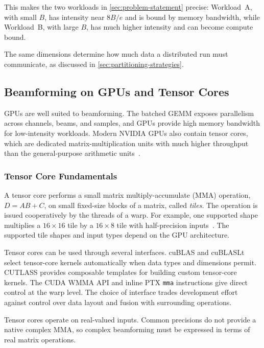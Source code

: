 This makes the two workloads in \cref{sec:problem-statement} precise: Workload~A, with small $B$, has intensity near $8B/e$ and is bound by memory bandwidth, while Workload~B, with large $B$, has much higher intensity and can become compute bound.

The same dimensions determine how much data a distributed run must communicate, as discussed in \cref{sec:partitioning-strategies}.

\subsection{Beamforming on GPUs and Tensor Cores}
\label{sec:beamforming-on-gpus-and-tensor-cores}

GPUs are well suited to beamforming. The batched GEMM exposes parallelism across channels, beams, and samples, and GPUs provide high memory bandwidth for low-intensity workloads. Modern NVIDIA GPUs also contain tensor cores, which are dedicated matrix-multiplication units with much higher throughput than the general-purpose arithmetic units~\cite{cudaProgrammingGuide}.

\subsubsection{Tensor Core Fundamentals}
\label{sec:tensor-core-fundamentals}

A tensor core performs a small matrix multiply-accumulate (MMA) operation, $D = AB + C$, on small fixed-size blocks of a matrix, called \emph{tiles}. The operation is issued cooperatively by the threads of a warp. For example, one supported shape multiplies a $16 \times 16$ tile by a $16 \times 8$ tile with half-precision inputs~\cite{ptxISA}. The supported tile shapes and input types depend on the GPU architecture.

Tensor cores can be used through several interfaces. cuBLAS and cuBLASLt select tensor-core kernels automatically when data types and dimensions permit. CUTLASS provides composable templates for building custom tensor-core kernels. The CUDA WMMA API and inline PTX \texttt{mma} instructions give direct control at the warp level. The choice of interface trades development effort against control over data layout and fusion with surrounding operations.

Tensor cores operate on real-valued inputs. Common precisions do not provide a native complex MMA, so complex beamforming must be expressed in terms of real matrix operations.

